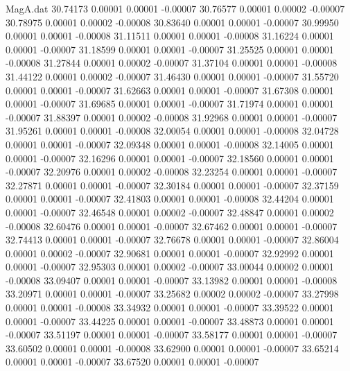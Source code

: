 \begin{filecontents}{MagA.dat}
  30.74173    0.00001    0.00001   -0.00007
  30.76577    0.00001    0.00002   -0.00007
  30.78975    0.00001    0.00002   -0.00008
  30.83640    0.00001    0.00001   -0.00007
  30.99950    0.00001    0.00001   -0.00008
  31.11511    0.00001    0.00001   -0.00008
  31.16224    0.00001    0.00001   -0.00007
  31.18599    0.00001    0.00001   -0.00007
  31.25525    0.00001    0.00001   -0.00008
  31.27844    0.00001    0.00002   -0.00007
  31.37104    0.00001    0.00001   -0.00008
  31.44122    0.00001    0.00002   -0.00007
  31.46430    0.00001    0.00001   -0.00007
  31.55720    0.00001    0.00001   -0.00007
  31.62663    0.00001    0.00001   -0.00007
  31.67308    0.00001    0.00001   -0.00007
  31.69685    0.00001    0.00001   -0.00007
  31.71974    0.00001    0.00001   -0.00007
  31.88397    0.00001    0.00002   -0.00008
  31.92968    0.00001    0.00001   -0.00007
  31.95261    0.00001    0.00001   -0.00008
  32.00054    0.00001    0.00001   -0.00008
  32.04728    0.00001    0.00001   -0.00007
  32.09348    0.00001    0.00001   -0.00008
  32.14005    0.00001    0.00001   -0.00007
  32.16296    0.00001    0.00001   -0.00007
  32.18560    0.00001    0.00001   -0.00007
  32.20976    0.00001    0.00002   -0.00008
  32.23254    0.00001    0.00001   -0.00007
  32.27871    0.00001    0.00001   -0.00007
  32.30184    0.00001    0.00001   -0.00007
  32.37159    0.00001    0.00001   -0.00007
  32.41803    0.00001    0.00001   -0.00008
  32.44204    0.00001    0.00001   -0.00007
  32.46548    0.00001    0.00002   -0.00007
  32.48847    0.00001    0.00002   -0.00008
  32.60476    0.00001    0.00001   -0.00007
  32.67462    0.00001    0.00001   -0.00007
  32.74413    0.00001    0.00001   -0.00007
  32.76678    0.00001    0.00001   -0.00007
  32.86004    0.00001    0.00002   -0.00007
  32.90681    0.00001    0.00001   -0.00007
  32.92992    0.00001    0.00001   -0.00007
  32.95303    0.00001    0.00002   -0.00007
  33.00044    0.00002    0.00001   -0.00008
  33.09407    0.00001    0.00001   -0.00007
  33.13982    0.00001    0.00001   -0.00008
  33.20971    0.00001    0.00001   -0.00007
  33.25682    0.00002    0.00002   -0.00007
  33.27998    0.00001    0.00001   -0.00008
  33.34932    0.00001    0.00001   -0.00007
  33.39522    0.00001    0.00001   -0.00007
  33.44225    0.00001    0.00001   -0.00007
  33.48873    0.00001    0.00001   -0.00007
  33.51197    0.00001    0.00001   -0.00007
  33.58177    0.00001    0.00001   -0.00007
  33.60502    0.00001    0.00001   -0.00008
  33.62900    0.00001    0.00001   -0.00007
  33.65214    0.00001    0.00001   -0.00007
  33.67520    0.00001    0.00001   -0.00007

\end{filecontents}
